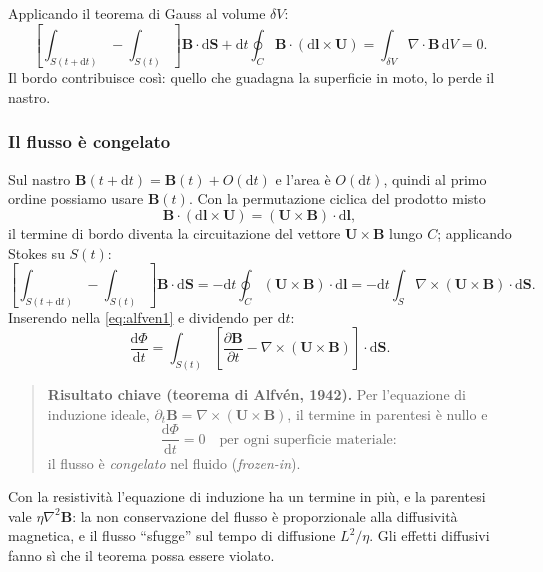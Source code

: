 Applicando il teorema di Gauss al volume $\delta V$:
\begin{equation}
\left[\int_{S(t+\mathrm{d}t)}-\int_{S(t)}\right]\mathbf{B}\cdot\mathrm{d}\mathbf{S}+\mathrm{d}t\oint_{C}\mathbf{B}\cdot(\mathrm{d}\mathbf{l}\times\mathbf{U})=\int_{\delta V}\nabla\cdot\mathbf{B}\,\mathrm{d}V=0 .
\end{equation}
Il bordo contribuisce così: quello che guadagna la superficie in moto, lo perde il nastro.

\subsubsection{Il flusso è congelato}

Sul nastro $\mathbf{B}(t+\mathrm{d}t)=\mathbf{B}(t)+O(\mathrm{d}t)$ e l'area è $O(\mathrm{d}t)$, quindi al primo ordine possiamo usare $\mathbf{B}(t)$. Con la permutazione ciclica del prodotto misto
\begin{equation}
\mathbf{B}\cdot(\mathrm{d}\mathbf{l}\times\mathbf{U})=(\mathbf{U}\times\mathbf{B})\cdot\mathrm{d}\mathbf{l},
\end{equation}
il termine di bordo diventa la circuitazione del vettore $\mathbf{U}\times\mathbf{B}$ lungo $C$; applicando Stokes su $S(t)$:
\begin{equation}
\left[\int_{S(t+\mathrm{d}t)}-\int_{S(t)}\right]\mathbf{B}\cdot\mathrm{d}\mathbf{S}=-\mathrm{d}t\oint_C(\mathbf{U}\times\mathbf{B})\cdot\mathrm{d}\mathbf{l}=-\mathrm{d}t\int_S\nabla\times(\mathbf{U}\times\mathbf{B})\cdot\mathrm{d}\mathbf{S}.
\end{equation}
Inserendo nella \eqref{eq:alfven1} e dividendo per $\mathrm{d}t$:
\begin{equation}
\frac{\mathrm{d}\Phi}{\mathrm{d}t}=\int_{S(t)}\left[\frac{\partial\mathbf{B}}{\partial t}-\nabla\times(\mathbf{U}\times\mathbf{B})\right]\cdot\mathrm{d}\mathbf{S}.
\end{equation}

\begin{quote}
\textbf{Risultato chiave (teorema di Alfvén, 1942).} Per l'equazione di induzione ideale, $\partial_t\mathbf{B}=\nabla\times(\mathbf{U}\times\mathbf{B})$, il termine in parentesi è nullo e
\[
\frac{\mathrm{d}\Phi}{\mathrm{d}t}=0\quad\text{per ogni superficie materiale}:
\]
il flusso è \emph{congelato} nel fluido (\emph{frozen-in}).
\end{quote}

Con la resistività l'equazione di induzione ha un termine in più, e la parentesi vale $\eta\nabla^2\mathbf{B}$: la non conservazione del flusso è proporzionale alla diffusività magnetica, e il flusso ``sfugge'' sul tempo di diffusione $L^2/\eta$. Gli effetti diffusivi fanno sì che il teorema possa essere violato.

